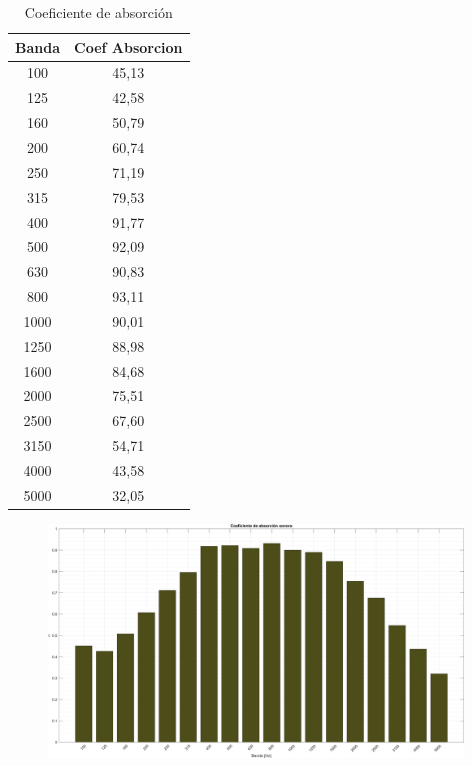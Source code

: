 \begin{table}[]
    \centering
    \begin{tabular}{|c|c|} \hline
        \textbf{Banda} & Coef Absorcion \\ \hline \hline
        100 & 45,13\\ \hline
        125	& 42,58\\ \hline
        160	& 50,79\\ \hline
        200	& 60,74\\ \hline
        250	& 71,19\\ \hline
        315	& 79,53\\ \hline
        400	& 91,77\\ \hline
        500	& 92,09\\ \hline
        630	& 90,83\\ \hline
        800	& 93,11\\ \hline
        1000&	90,01\\ \hline
        1250&	88,98\\ \hline
        1600&	84,68\\ \hline
        2000&	75,51\\ \hline
        2500&	67,60\\ \hline
        3150&	54,71\\ \hline
        4000&	43,58\\ \hline
        5000&	32,05\\ \hline
    \end{tabular}
    \caption{Coeficiente de absorción}
    \label{tab:coef_absorcion_sonora}
\end{table}



\begin{figure}[H]
	\centering
	\includegraphics[width=0.98\textwidth]{./img/Coef_absorcion_sonora_bars.png}
	\caption{}
	\label{fig::coef_absorcion_sonora}
\end{figure}


